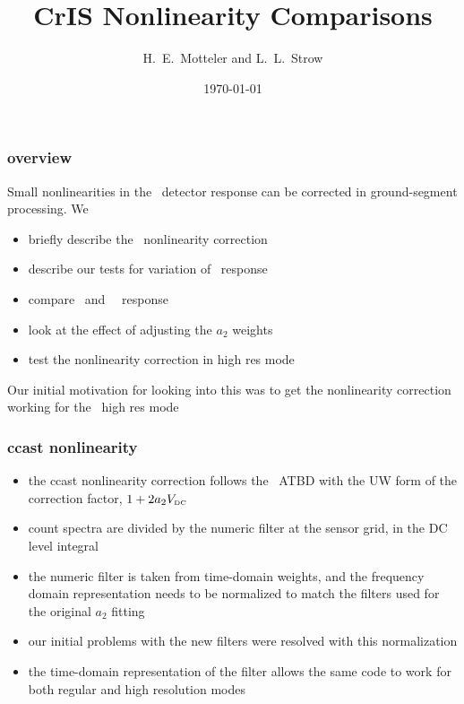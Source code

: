 \documentclass[11pt]{beamer}
\title{CrIS Nonlinearity Comparisons}
\author{H.~E.~Motteler and L.~L.~Strow}
\institute{
  UMBC Atmospheric Spectroscopy Lab \\
  Joint Center for Earth Systems Technology \\
}
\date{\today}
\begin{document}
\begin{frame}[plain]
\titlepage
\end{frame}
\begin{frame}
\frametitle{overview}

Small nonlinearities in the \cris\ detector response can be corrected
in ground-segment processing.  We

\begin{itemize}
  \item briefly describe the \ccast\ nonlinearity correction

  \item describe our tests for variation of \fov\ response

  \item compare \ccast\ and \idps\ \fov\ response

  \item look at the effect of adjusting the $a_2$ weights

  \item test the nonlinearity correction in high res mode
\end{itemize}

Our initial motivation for looking into this was to get the
nonlinearity correction working for the \cris\ high res mode

\end{frame}
\begin{frame}
\frametitle{ccast nonlinearity} 

\begin{itemize}
  \item the ccast nonlinearity correction follows the \cris\ ATBD with
    the UW form of the correction factor, $1 + 2a_2V_{\mbox{\tiny DC}}$

  \item count spectra are divided by the numeric filter at the
    sensor grid, in the DC level integral

  \item the numeric filter is taken from time-domain weights, and
    the frequency domain representation needs to be normalized to
    match the filters used for the original $a_2$ fitting

  \item our initial problems with the new filters were resolved with
    this normalization

  \item the time-domain representation of the filter allows the same
    code to work for both regular and high resolution modes
\end{itemize}

\end{frame}
\end{document}

